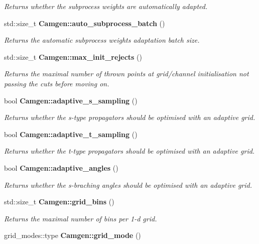 \begin{DoxyCompactItemize}
\begin{DoxyCompactList}\small\item\em Returns whether the subprocess weights are automatically adapted. \end{DoxyCompactList}\item 
\hypertarget{a00878_abe2b1aab7d10219076e10f2dc0ea1944}{}std\+::size\+\_\+t {\bfseries Camgen\+::auto\+\_\+subprocess\+\_\+batch} ()\label{a00878_abe2b1aab7d10219076e10f2dc0ea1944}

\begin{DoxyCompactList}\small\item\em Returns the automatic subprocess weights adaptation batch size. \end{DoxyCompactList}\item 
std\+::size\+\_\+t {\bfseries Camgen\+::max\+\_\+init\+\_\+rejects} ()
\begin{DoxyCompactList}\small\item\em Returns the maximal number of thrown points at grid/channel initialisation not passing the cuts before moving on. \end{DoxyCompactList}\item 
bool {\bfseries Camgen\+::adaptive\+\_\+s\+\_\+sampling} ()
\begin{DoxyCompactList}\small\item\em Returns whether the s-\/type propagators should be optimised with an adaptive grid. \end{DoxyCompactList}\item 
bool {\bfseries Camgen\+::adaptive\+\_\+t\+\_\+sampling} ()
\begin{DoxyCompactList}\small\item\em Returns whether the t-\/type propagators should be optimised with an adaptive grid. \end{DoxyCompactList}\item 
bool {\bfseries Camgen\+::adaptive\+\_\+angles} ()
\begin{DoxyCompactList}\small\item\em Returns whether the s-\/braching angles should be optimised with an adaptive grid. \end{DoxyCompactList}\item 
\hypertarget{a00878_a909bd9954cd0132a45102c5fca15e259}{}std\+::size\+\_\+t {\bfseries Camgen\+::grid\+\_\+bins} ()\label{a00878_a909bd9954cd0132a45102c5fca15e259}

\begin{DoxyCompactList}\small\item\em Returns the maximal number of bins per 1-\/d grid. \end{DoxyCompactList}\item 
\hypertarget{a00878_a1f8278cb3de70846a499c98c6b60ff9e}{}grid\+\_\+modes\+::type {\bfseries Camgen\+::grid\+\_\+mode} ()\label{a00878_a1f8278cb3de70846a499c98c6b60ff9e}


\end{DoxyCompactItemize}
